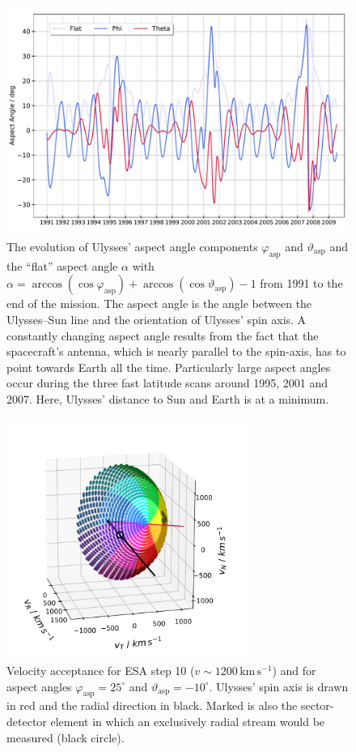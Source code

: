 \begin{figure}[h]
	\includegraphics[width=1\textwidth]{Figures/aaa.pdf}
	\centering
	\caption{The evolution of Ulysses' aspect angle components $\varphi_{\mathrm{asp}}$ and $\vartheta_{\mathrm{asp}}$ and the ``flat'' aspect angle $\alpha$ with  $\alpha = \arccos(\cos{\varphi_{\mathrm{asp}}}) + \arccos(\cos{\vartheta_{\mathrm{asp}}}) -1$ from 1991 to the end of the mission. The aspect angle is the angle between the Ulysses--Sun line and the orientation of Ulysses' spin axis. A constantly changing aspect angle results from the fact that the spacecraft's antenna, which is nearly parallel to the spin-axis, has to point towards Earth all the time. Particularly large aspect angles occur during the three fast latitude scans around 1995, 2001 and 2007. Here, Ulysses' distance to Sun and Earth is at a minimum.}
	\label{fig:aa}
\end{figure}
\begin{figure}[h]
	\includegraphics[width=0.7\textwidth]{Figures/col_aa_marker.png}
	\centering
	\caption{Velocity acceptance for ESA step 10 ($v \sim 1200 \,\mathrm{km\,s^{-1}}$) and for aspect angles $\varphi_\mathrm{asp} = 25^\circ$ and $\vartheta_{\mathrm{asp}} = -10^\circ $. Ulysses' spin axis is drawn in red and the radial direction in black. Marked is also the sector-detector element in  which an exclusively radial stream would be measured (black circle).}
	\label{fig:col_aa}
\end{figure}
